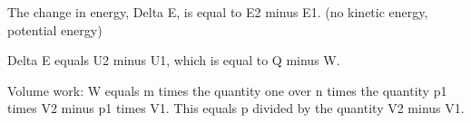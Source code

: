 The change in energy, Delta E, is equal to E2 minus E1. (no kinetic energy, potential energy)

Delta E equals U2 minus U1, which is equal to Q minus W.

Volume work:
W equals m times the quantity one over n times the quantity p1 times V2 minus p1 times V1.
This equals p divided by the quantity V2 minus V1.
